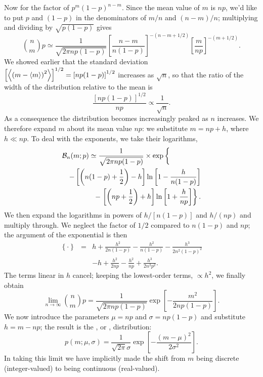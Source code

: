 Now for the factor of $p^{m}(1-p)^{n-m}$. Since the mean value of $m$ is $np$, we'd like to put $p$ and $(1-p)$ in the denominators of $m/n$ and $(n-m)/n$; multiplying and dividing by $\sqrt{p(1-p)}$ gives
\[
	\binom{n}{m}{p} \simeq \frac{1}{\sqrt{2\pi np(1-p)}} \left[\frac{n-m}{n(1-p)}\right]^{-(n-m+1/2)} \left[\frac{m}{np}\right]^{-(m+1/2)}.
\]
We showed earlier that the standard deviation $\left[\left\langle\left(m-\left\langle m\right\rangle\right)^{2}\right\rangle\right]^{1/2} = \left[np(1-p)\right]^{1/2}$ increases as $\sqrt n$, so that the ratio of the width of the distribution relative to the mean is
\[
	\frac{\left[np(1-p)\right]^{1/2}}{np} \propto \frac{1}{\sqrt{n}}.
\]
As a consequence the distribution becomes increasingly peaked as $n$ increases. We therefore expand $m$ about its mean value $np$: we substitute $m = np + h$, where $h \ll np$. To deal with the exponents, we take their logarithms,
\begin{eqnarray*}
	\lefteqn{\binom{n}{m}{p}\simeq \frac{1}{\sqrt{2\pi np(1-p)}} \times\exp\bigg\{ }\\
	&& 
		-\left[\left(n(1-p)+\frac{1}{2}\right) - h\right]\ln\left[1-\frac{h}{n(1-p)}\right]\\
	&&	-\left.\left[\left(np+\frac{1}{2}\right) + h\right]\ln\left[1+\frac{h}{np}\right]\right\}.
\end{eqnarray*}
We then expand the logarithms
in powers of $h/[n(1-p)]$ and $h/(np)$ and multiply through. We neglect the factor of $1/2$ compared to $n(1-p)$ and $np$; the argument of the exponential is then
\begin{eqnarray*}
\left\{\cdot\right\} &=& h + \frac{h^{2}}{2n(1-p)} - \frac{h^{2}}{n(1-p)} - \frac{h^{3}}{2n^{2}(1-p)^{2}} \\
 && -h + \frac{h^{2}}{2np} - \frac{h^{2}}{np} + \frac{h^{3}}{2n^{2}p^{2}}.
\end{eqnarray*}
The terms linear in $h$ cancel; keeping the lowest-order terms, $\propto h^{2}$, we finally obtain
\begin{equation}\label{e.binomiallimit}
	\lim_{n\to\infty}\binom{n}{m}{p} = \frac{1}{\sqrt{2\pi np(1-p)}}
		\exp\left[-\frac{m^{2}}{2np(1-p)}\right].
\end{equation}
We now introduce the parameters $\mu = np$ and $\sigma = np(1-p)$ and substitute $h = m-np$; the result is the , or , distribution:
\begin{equation}\label{e.gaussian-m}
p(m; \mu,\sigma) = \frac{1}{\sqrt{2\pi}\sigma} \exp\left[-\frac{\left(m-\mu\right)^{2}}{2\sigma^{2}}\right].
\end{equation}
In taking this limit we have implicitly made the shift from $m$ being discrete (integer-valued) to being continuous (real-valued).


